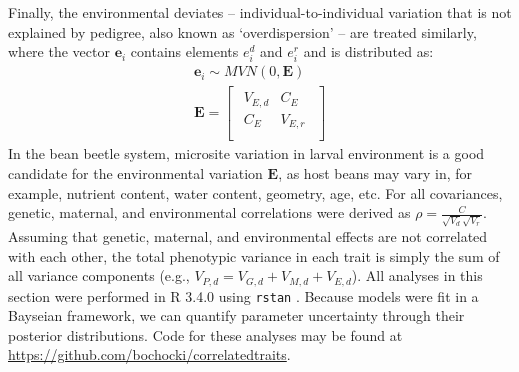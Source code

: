 \documentclass[11pt]{article}
\def\code#1{\texttt{#1}}
\begin{document}
Finally, the environmental deviates -- individual-to-individual variation that is not explained by pedigree, also known as `overdispersion' \citep{de2016general} -- are treated similarly, where the vector $\bm{e}_{i}$ contains elements $e^{d}_{i}$ and $e^{r}_{i}$ and is distributed as:
%
\begin{gather} \label{corr:env}
  \bm{e}_{i} \sim \mathit{MVN} (0, \bm{E}) \\[5pt]
  \bm{E} =
  \begin{bmatrix}
    \begin{array}{ll}
      V_{E,d} &C_{E}   \\
      C_{E}   &V_{E,r} \\
    \end{array}
  \end{bmatrix}
\end{gather}
%
In the bean beetle system, microsite variation in larval environment is a good candidate for the environmental variation $\bm{E}$, as host beans may vary in, for example, nutrient content, water content, geometry, age, etc.
For all covariances, genetic, maternal, and environmental correlations were derived as $\rho = \frac{C}{\sqrt{V_{d}}\sqrt{V_{r}}}$.
Assuming that genetic, maternal, and environmental effects are not correlated with each other, the total phenotypic variance in each trait is simply the sum of all variance components (e.g., $V_{P,d} = V_{G,d} + V_{M,d} + V_{E,d}$). 
%
%
All analyses in this section were performed in R 3.4.0 \citep{r_core_team_r:_2015} using \code{rstan} \citep{stan_development_team_rstan:_2015}.
Because models were fit in a Bayseian framework, we can quantify parameter uncertainty through their posterior distributions.
Code for these analyses may be found at \url{https://github.com/bochocki/correlatedtraits}.
\end{document}
